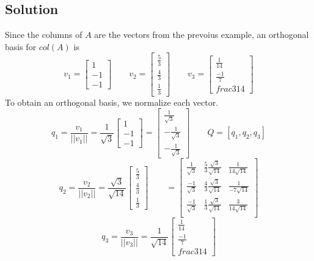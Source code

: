 \subsection*{Solution}
Since the columns of $A$ are the vectors from the prevoius example, an orthogonal basis for $col(A)$ is
$$v_1 = \begin{bmatrix}
    1\\-1\\-1
\end{bmatrix}\qquad v_2 = \begin{bmatrix}
    \frac{5}{3}\\\frac{4}{3}\\\frac{1}{3}
\end{bmatrix}\qquad v_3 = \begin{bmatrix}
    \frac{1}{14}\\\frac{-1}{7}\\frac{3}{14}
\end{bmatrix}$$
To obtain an orthogonal basis, we normalize each vector.
$$q_1 = \frac{v_1}{||v_1||} = \frac{1}{\sqrt{3}}\begin{bmatrix}
    1\\-1\\-1
\end{bmatrix} = \begin{bmatrix}
    \frac{1}{\sqrt{3}}\\-\frac{1}{\sqrt{3}}\\-\frac{1}{\sqrt{3}}
\end{bmatrix}\qquad Q = [q_1, q_2, q_3]$$
$$q_2 = \frac{v_2}{||v_2||} = \frac{\sqrt{3}}{\sqrt{14}}\begin{bmatrix}
    \frac{5}{3}\\\frac{4}{3}\\\frac{1}{3}
\end{bmatrix}\qquad = \begin{bmatrix}
    \frac{1}{\sqrt{3}}&\frac{5}{3}\frac{\sqrt{3}}{\sqrt{14}}&\frac{1}{14\sqrt{14}}\\
    \frac{-1}{\sqrt{3}}&\frac{4}{3}\frac{\sqrt{3}}{\sqrt{14}}&\frac{1}{-7\sqrt{14}}\\
    \frac{-1}{\sqrt{3}}&\frac{1}{3}\frac{\sqrt{3}}{\sqrt{14}}&\frac{3}{14\sqrt{14}}\\
\end{bmatrix}$$
$$q_3 = \frac{v_3}{||v_3||} = \frac{1}{\sqrt{14}}\begin{bmatrix}
    \frac{1}{14}\\\frac{-1}{7}\\frac{3}{14}
\end{bmatrix}$$

